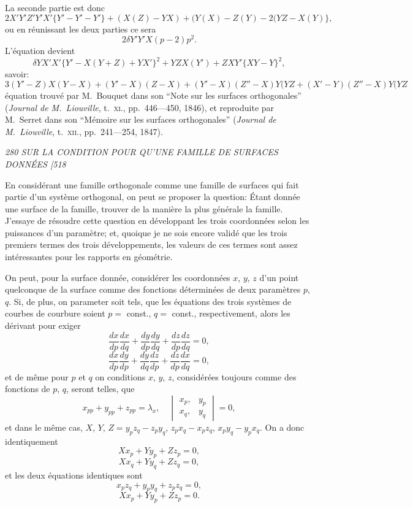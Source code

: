 \documentclass[11pt,a4paper]{book}
\begin{document}
La seconde partie est donc
\[
2X' Y' Z' Y' X'\{Y' - Y' - Y'\} + (X(Z) - YX) + (Y(X) - Z(Y) - 2(YZ - X(Y)\},
\]
ou en r\'eunissant les deux parties ce sera
\[
2\delta Y' Y' X(p - 2)p^2.
\]
L'\'equation devient
\[
\delta Y X' X'\{Y' - X(Y + Z) + Y X'\}^2 + Y Z X(Y') + Z X Y'\{XY - Y\}^2,
\]
savoir:
\[
3(Y' - Z) X(Y - X) + (Y' - X)(Z - X) + (Y' - X)(Z'' - X)Y(YZ + (X' - Y)(Z'' - X)Y(YZ
\]
\'equation trouv\'e par M.~Bouquet dans son ``Note sur les surfaces orthogonales''
(\textit{Journal de M.~Liouville}, t.~\textsc{xi.}, pp.~446---450, 1846), et reproduite par M.~Serret dans
son ``M\'emoire sur les surfaces orthogonales'' (\textit{Journal de M.~Liouville}, t.~\textsc{xii.}, pp.~241---254,
1847).

\clearpage

\noindent\textit{280 \hfill SUR LA CONDITION POUR QU'UNE FAMILLE DE SURFACES DONN\'EES \hfill [518}

\medskip

\quad [Pp.~324---330.]

\medskip

En consid\'erant une famille orthogonale comme une famille de surfaces qui fait
partie d'un syst\`eme orthogonal, on peut se proposer la question: \'Etant donn\'ee une
surface de la famille, trouver de la mani\`ere la plus g\'en\'erale la famille. J'essaye de
r\'esoudre cette question en d\'eveloppant les trois coordonn\'ees selon les puissances d'un
param\`etre; et, quoique je ne sois encore valid\'e que les trois premiers termes des trois
d\'eveloppements, les valeurs de ces termes sont assez int\'eressantes pour les rapports en
g\'eom\'etrie.

\medskip

\quad On peut, pour la surface donn\'ee, consid\'erer les coordonn\'ees $x$, $y$, $z$ d'un point
quelconque de la surface comme des fonctions d\'etermin\'ees de deux param\`etres $p$, $q$.
Si, de plus, on parameter soit tels, que les \'equations des trois syst\`emes de courbes
de courbure soient $p = $ const., $q = $ const., respectivement, alors les d\'erivant pour exiger
\[
\frac{dx}{dp}\frac{dx}{dq} + \frac{dy}{dp}\frac{dy}{dq} + \frac{dz}{dp}\frac{dz}{dq} = 0,
\]
\[
\frac{dx}{dp}\frac{dy}{dp} + \frac{dy}{dq}\frac{dz}{dp} + \frac{dz}{dp}\frac{dx}{dq} = 0,
\]
et de m\^eme pour $p$ et $q$ on conditions $x$, $y$, $z$, consid\'er\'ees toujours comme des
fonctions de $p$, $q$, seront telles, que
\[
x_{pp} + y_{pp} + z_{pp} = \lambda_{x}, \quad
\begin{vmatrix}
x_p, & y_p \\
x_q, & y_q
\end{vmatrix} = 0,
\]
et dans le m\^eme cas, $X$, $Y$, $Z = y_p z_q - z_p y_q$, $z_p x_q - x_p z_q$, $x_p y_q - y_p x_q$. On a donc
identiquement
\[
X x_p + Y y_p + Z z_p = 0,
\]
\[
X x_q + Y y_q + Z z_q = 0,
\]
et les deux \'equations identiques sont
\[
x_p z_q + y_p y_q + z_p z_q = 0,
\]
\[
X x_p + Y y_p + Z z_p = 0.
\]
\end{document}

